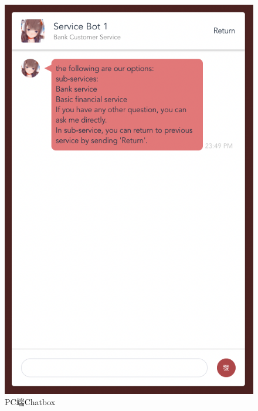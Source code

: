 \documentclass[hyperref]{ctexart}
\begin{document}
\begin{multicols}{2}
\begin{figure}[H]
        \includegraphics[scale=0.2]{figure/10.png}
        \caption{PC端Chatbox}
        \label{Fig.1.10}
    \end{figure}
    \begin{figure}[H]
        \centering

\end{figure}
\end{multicols}
\end{document}
